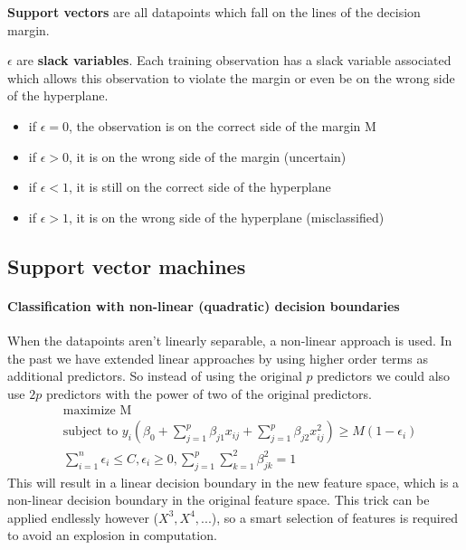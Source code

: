 \documentclass[../document.tex]{subfiles}
\begin{document}
	\textbf{Support vectors} are all datapoints which fall on the lines of the decision margin.

	$\epsilon$ are \textbf{slack variables}. Each training observation has a slack variable associated which allows this observation to violate the margin or even be on the wrong side of the hyperplane.
	\begin{itemize}
		\item if $\epsilon=0$, the observation is on the correct side of the margin M
		\item if $\epsilon>0$, it is on the wrong side of the margin (uncertain)
		\item if $\epsilon<1$, it is still on the correct side of the hyperplane
		\item if $\epsilon>1$, it is on the wrong side of the hyperplane (misclassified)
	\end{itemize}

	\subsection{Support vector machines}

	\paragraph{Classification with non-linear (quadratic) decision boundaries}
	When the datapoints aren't linearly separable, a non-linear approach is used. In the past we have extended linear approaches by using higher order terms as additional predictors. So instead of using the original $p$ predictors we could also use $2p$ predictors with the power of two of the original predictors.
	\begin{equation}
	\begin{split}
		&\text{maximize M}\\
		&\text{subject to } y_{i}(\beta_{0}+\sum_{j=1}^{p}\beta_{j1}x_{ij}+\sum_{j=1}^{p}\beta_{j2}x_{ij}^2)\ge M(1-\epsilon_{i})\\
		&\sum_{i=1}^{n}\epsilon_{i}\le C, \epsilon_{i}\ge 0, \sum_{j=1}^{p}\sum_{k=1}^{2}\beta_{jk}^2=1
	\end{split}
	\end{equation}
	This will result in a linear decision boundary in the new feature space, which is a non-linear decision boundary in the original feature space. This trick can be applied endlessly however ($X^3, X^4, ...$), so a smart selection of features is required to avoid an explosion in computation.
\end{document}

